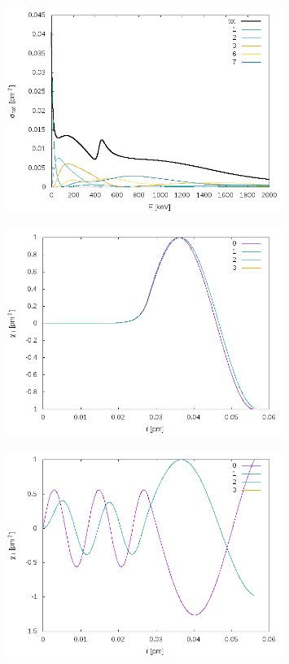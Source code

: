 \documentclass[11pt]{article}
\begin{document}
\begin{figure} 
\centering
\includegraphics[width=0.8\textwidth]{S-.png}
\caption{}\label{fig:1}
\end{figure}
\begin{figure} 
\centering
\includegraphics[width=0.8\textwidth]{chi_E10+.png}
\caption{}\label{fig:1}
\end{figure}
\begin{figure} 
\centering
\includegraphics[width=0.8\textwidth]{chi_E10.png}
\caption{}\label{fig:1}
\end{figure}
\end{document}

